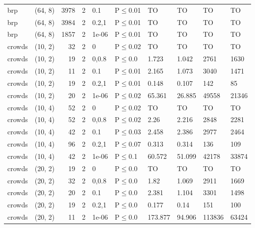 \begin{longtable}{llrrllllll}
 brp           & (64, 8)   &   	3978 &    2 & 0.1   & P$\leq$0.01  & TO       & TO       & TO      & TO      \\
 brp           & (64, 8)   &   	3984 &    2 & 0.2,1 & P$\leq$0.01  & TO       & TO       & TO      & TO      \\
 brp           & (64, 8)   &   	1857 &    2 & 1e-06 & P$\leq$0.01  & TO       & TO       & TO      & TO      \\
 crowds        & (10, 2)   &     	32 &    2 & 0     & P$\leq$0.02  & TO       & TO       & TO      & TO      \\
 crowds        & (10, 2)   &     	19 &    2 & 0,0.8 & P$\leq$0.0   & 1.723    & 1.042    & 2761    & 1630    \\
 crowds        & (10, 2)   &     	11 &    2 & 0.1   & P$\leq$0.01  & 2.165    & 1.073    & 3040    & 1471    \\
 crowds        & (10, 2)   &     	19 &    2 & 0.2,1 & P$\leq$0.01  & 0.148    & 0.107    & 142     & 85      \\
 crowds        & (10, 2)   &     	20 &    2 & 1e-06 & P$\leq$0.02  & 65.361   & 26.885   & 49558   & 21346   \\
 crowds        & (10, 4)   &     	52 &    2 & 0     & P$\leq$0.02  & TO       & TO       & TO      & TO      \\
 crowds        & (10, 4)   &     	52 &    2 & 0,0.8 & P$\leq$0.02  & 2.26     & 2.216    & 2848    & 2281    \\
 crowds        & (10, 4)   &     	42 &    2 & 0.1   & P$\leq$0.03  & 2.458    & 2.386    & 2977    & 2464    \\
 crowds        & (10, 4)   &     	96 &    2 & 0.2,1 & P$\leq$0.07  & 0.313    & 0.314    & 136     & 109     \\
 crowds        & (10, 4)   &     	42 &    2 & 1e-06 & P$\leq$0.1   & 60.572   & 51.099   & 42178   & 33874   \\
 crowds        & (20, 2)   &     	19 &    2 & 0     & P$\leq$0.0   & TO       & TO       & TO      & TO      \\
 crowds        & (20, 2)   &     	32 &    2 & 0,0.8 & P$\leq$0.0   & 1.82     & 1.069    & 2911    & 1669    \\
 crowds        & (20, 2)   &     	20 &    2 & 0.1   & P$\leq$0.0   & 2.381    & 1.104    & 3301    & 1498    \\
 crowds        & (20, 2)   &     	19 &    2 & 0.2,1 & P$\leq$0.0   & 0.177    & 0.14     & 151     & 100     \\
 crowds        & (20, 2)   &     	11 &    2 & 1e-06 & P$\leq$0.0   & 173.877  & 94.906   & 113836  & 63424   \\

\end{longtable}
